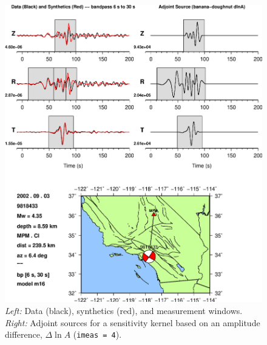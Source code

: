 \documentclass[11pt,titlepage,fleqn]{article}
\begin{document}
\begin{figure}
\includegraphics[width=17cm]{9818433_T006_T030_MPM_CI_m16_iker04_win_adj.eps}
\caption[]
{{
{\em Left:} Data (black), synthetics (red), and measurement windows.
{\em Right:} Adjoint sources for a sensitivity kernel based on an amplitude difference, $\Delta \ln A$ ({\tt imeas = 4}).
\label{fig:iker04}
}}
\end{figure}
\end{document}
